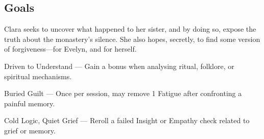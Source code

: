 \documentclass[nodeprecatedcode,bg=print]{dndbook/dndbook}
\begin{document}
\begin{WyrdCharacterSheet}
    \subsection{Goals}
    Clara seeks to uncover what happened to her sister, and by doing so, expose the truth about the monastery’s silence. She also hopes, secretly, to find some version of forgiveness—for Evelyn, and for herself.
  
    \begin{WyrdStatsBlock}[profile=img/characters/clara_ashcroft]
        \SkillsBox[%
            expert={Lore},%
            skilled={Investigation, Insight},%
            novice={Awareness, Empathy, Focus},%
        ]
  
        \begin{TraitsBox}
            \item[Driven to Understand] — Gain a bonus when analysing ritual, folklore, or spiritual mechanisms.
            \item[Buried Guilt] — Once per session, may remove 1 Fatigue after confronting a painful memory.
            \item[Cold Logic, Quiet Grief] — Reroll a failed Insight or Empathy check related to grief or memory.
        \end{TraitsBox}
  
        \DamageBox[%
        ]
    \end{WyrdStatsBlock}
  \end{WyrdCharacterSheet}
  
\end{document}
